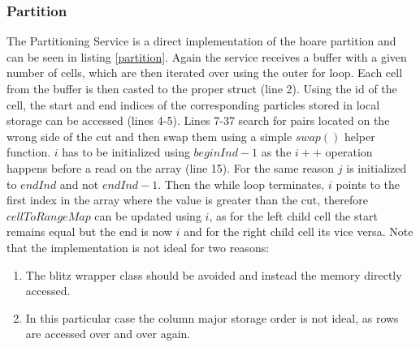 \documentclass[]{article}
\begin{document}
\subsubsection{Partition}

The Partitioning Service is a direct implementation of the hoare partition and can be seen in listing \ref{partition}. Again the service receives a buffer with a given number of cells, which are then iterated over using the outer for loop. Each cell from the buffer is then casted to the proper struct (line 2). Using the id of the cell, the start and end indices of the corresponding particles stored in local storage can be accessed (lines 4-5). Lines 7-37 search for pairs located on the wrong side of the cut and then swap them using a simple $swap()$ helper function. $i$ has to be initialized using $beginInd -1$ as the $i++$ operation happens before a read on the array (line 15). For the same reason $j$ is initialized to $endInd$ and not $endInd -1$. Then the while loop terminates, $i$ points to the first index in the array where the value is greater than the cut, therefore $cellToRangeMap$ can be updated using $i$, as for the left child cell the start remains equal but the end is now $i$ and for the right child cell its vice versa. 
Note that the implementation is not ideal for two reasons:

\begin{enumerate}
	\item The blitz wrapper class should be avoided and instead the memory directly accessed.
	\item In this particular case the column major storage order is not ideal, as rows are accessed over and over again.
\end{enumerate}
\end{document}
